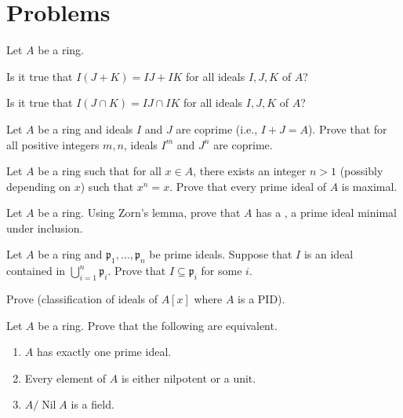 \section{Problems}
\begin{problem}
Let $A$ be a ring.
\begin{alphenum}
\item Is it true that $I(J+K) = IJ + IK$ for all ideals $I,J,K$ of $A$?
\item Is it true that $I(J\cap K) = IJ\cap IK$ for all ideals $I,J,K$ of $A$?
\end{alphenum}
\end{problem}
\begin{problem}
Let $A$ be a ring and ideals $I$ and $J$ are coprime
(i.e., $I+J=A$). Prove that for all positive integers $m,n$,
ideals $I^m$ and $J^n$ are coprime.
\end{problem}
\begin{problem}
Let $A$ be a ring such that for all $x\in A$, there exists an integer $n>1$ (possibly depending on $x$) such that $x^n=x$. Prove that every prime ideal of $A$ is maximal.
\end{problem}
\begin{problem}
Let $A$ be a ring.
Using Zorn's lemma, prove that $A$ has a 
,
a prime ideal minimal under inclusion.
\end{problem}
\begin{problem}
\label{prob:prime_avoidance}
Let $A$ be a ring and $\mathfrak p_1,\dots,\mathfrak p_n$ be prime ideals. Suppose that $I$ is an ideal contained in $\bigcup_{i=1}^n\mathfrak p_i$. Prove that $I\subseteq\mathfrak p_i$ for some $i$.
\end{problem}
\begin{problem}
\label{prob:ideal_pid}
Prove  (classification of ideals of $A[x]$
where $A$ is a PID).
\end{problem}
\begin{problem}
Let $A$ be a ring. Prove that the following are equivalent.
\begin{enumerate}[label=(\alph*)]
\item $A$ has exactly one prime ideal.
\item Every element of $A$ is either nilpotent or a unit.
\item $A/\operatorname{Nil} A$ is a field.
\end{enumerate}
\end{problem}
